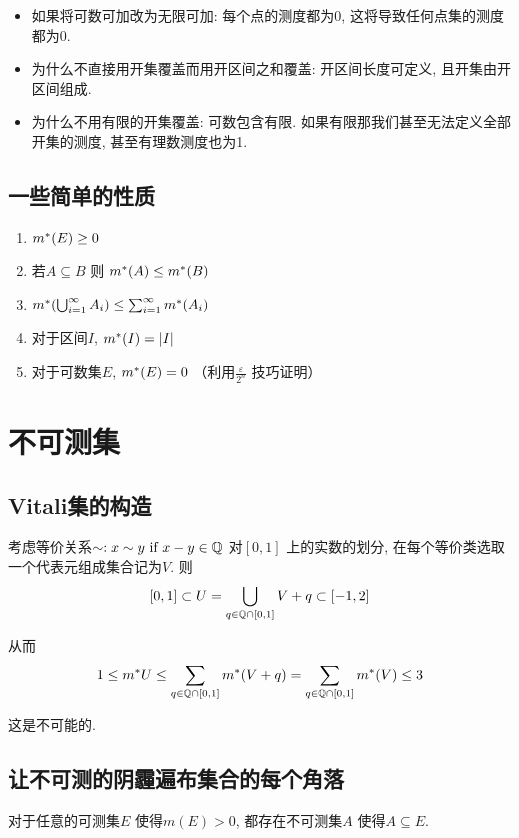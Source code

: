 \begin{itemize}
    \item 如果将可数可加改为无限可加: 每个点的测度都为0, 这将导致任何点集的测度都为0.
    \item 为什么不直接用开集覆盖而用开区间之和覆盖: 开区间长度可定义, 且开集由开区间组成.
    \item 为什么不用有限的开集覆盖: 可数包含有限. 如果有限那我们甚至无法定义全部开集的测度, 甚至有理数测度也为1.
\end{itemize}

\subsection{一些简单的性质}
\begin{enumerate}
    \item \(m^{*}(E)\geq 0\)
    \item 若\(A \subseteq B\) 则 \(m^{*}(A) \leq m^{*}(B)\)
    \item \(m^{*}(\bigcup_{i=1}^{\infty} A_{i}) \leq
        \sum_{i=1}^{\infty} m^{*}(A_{i})\)
    \item 对于区间\(I\), \(m^{*}(I) = |I|\)
    \item 对于可数集\(E\), \(m^{*}(E) = 0\)
        （利用\(\frac{\varepsilon}{2^{n}}\) 技巧证明）

\end{enumerate}

\section{不可测集}

\subsection{Vitali集的构造}
考虑等价关系\(\sim: x\sim y \text{ if } x-y \in \mathbb{Q}\) 对\([0,1]\)
上的实数的划分, 在每个等价类选取一个代表元组成集合记为\(V\). 则\[
    [0,1] \subset U=\bigcup_{q \in \mathbb{Q}\cap[0,1]} V+q \subset [-1,2]
\]

从而\[
    1\leq m^{*} U \leq \sum_{q \in \mathbb{Q}\cap[0,1]} m^{*}(V+q) = \sum_{q \in
    \mathbb{Q}\cap[0,1]} m^{*}(V) \leq 3
\]

这是不可能的.

\subsection{让不可测的阴霾遍布集合的每个角落}
\begin{theorem}
    对于任意的可测集\(E\) 使得\(m(E)>0\), 都存在不可测集\(A\) 使得\(A \subseteq E\).
\end{theorem}

